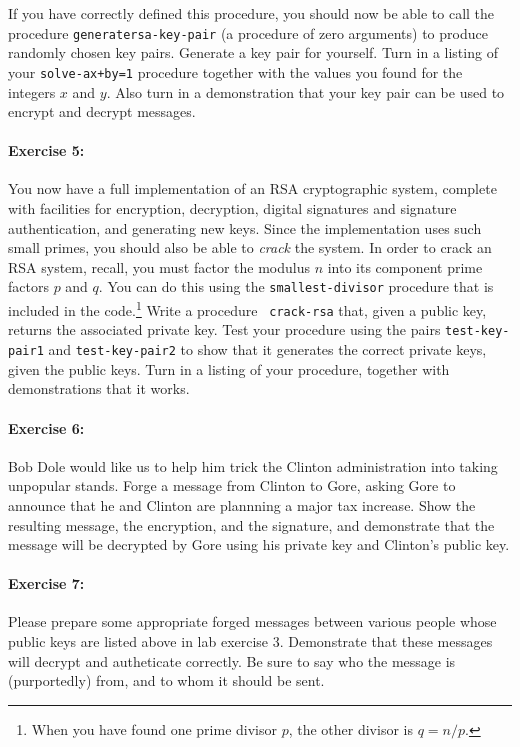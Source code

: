 \noindent
If you have correctly defined this procedure, you should now be able
to call the procedure {\tt generate\-rsa-key-pair} (a procedure of
zero arguments) to produce randomly chosen key pairs.  Generate a key
pair for yourself.  Turn in a listing of your {\tt solve-ax+by=1}
procedure together with the values you found for the integers $x$ and $y$.
Also turn in a demonstration that your key pair can be used to encrypt and
decrypt messages.

\paragraph{Exercise 5:}
You now have a full implementation of an RSA cryptographic system,
complete with facilities for encryption, decryption, digital
signatures and signature authentication, and generating new keys.
Since the implementation uses such small primes, you should also be able to
{\it crack} the system.  In order to crack an RSA system, recall, you
must factor the modulus $n$ into its component prime factors $p$ and
$q$.  You can do this using the {\tt smallest-divisor} procedure that
is included in the code.\footnote{When you have found one prime
divisor $p$, the other divisor is $q=n/p$.} Write a procedure {\tt
crack-rsa} that, given a public key, returns the associated private
key.  Test your procedure using the pairs {\tt test-key-pair1} and
{\tt test-key-pair2} to show that it generates the correct private
keys, given the public keys.  Turn in a listing of your procedure,
together with demonstrations that it works.


\paragraph{Exercise 6:}
Bob Dole would like us to help him trick the Clinton administration
into taking unpopular stands.  Forge a message from Clinton to Gore,
asking Gore to announce that he and Clinton are plannning a major tax
increase.  Show the resulting message, the encryption, and the
signature, and demonstrate that the message will be decrypted by Gore
using his private key and Clinton's public key.

\paragraph{Exercise 7:}

Please prepare some appropriate forged messages between various people
whose public keys are listed above in lab exercise 3.  Demonstrate that
these messages will decrypt and autheticate correctly.  Be sure to say
who the message is (purportedly) from, and to whom it should be sent.

